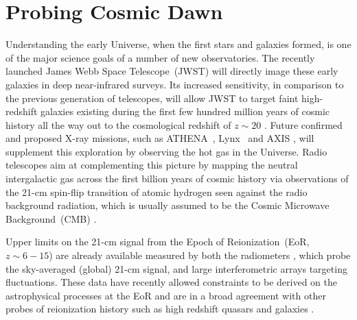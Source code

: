 \section{Probing Cosmic Dawn}\label{sec1}

Understanding the early Universe, when the first stars and galaxies formed, is one of the major science goals of a number of new observatories. The recently launched James Webb Space Telescope~(JWST) will directly image these early galaxies in deep near-infrared surveys. Its increased sensitivity, in comparison to the previous generation of telescopes, will allow JWST to target faint high-redshift galaxies existing during the first few hundred million years of cosmic history all the way out to the cosmological redshift of $z\sim 20$ \cite{Windhorst_JWST_2006}. Future confirmed and proposed X-ray missions, such as ATHENA~\citep[Advanced Telescope for High Energy Astrophysics,][]{Athena}, Lynx~\cite{Lynx} and AXIS \citep[Advanced X-ray Imaging Satellite,][]{axis}, will supplement this exploration by observing the hot gas in the Universe. Radio telescopes aim at complementing this picture by mapping the neutral intergalactic gas across the first billion years of cosmic history via observations of the 21-cm spin-flip transition of atomic hydrogen seen against the radio background radiation, which is usually assumed to be the Cosmic Microwave Background~(CMB) \cite{Madau1997, Mesinger2019}. 

Upper limits on the 21-cm signal from the Epoch of Reionization~(EoR, $z\sim6-15$) are already available measured by both the radiometers \cite{ EDGES_high_band_experimental_paper_2017, SARAS2_radiometer_2018}, which probe the sky-averaged (global) 21-cm signal, and large interferometric arrays \cite{HERA_2017, LOFAR_current_EoR_2018, Price_LEDA_2018, Trott_mwa_2020, Gehlot_lofar_2019} targeting fluctuations. These data have recently allowed constraints to be derived on the astrophysical processes at the EoR \cite[][e.g. \cref{ch:saras2},]{Singh_saras2_2017, Singh_saras2_2018, Monsalve_EDGES_HB_3_2019, Mondal_LOFAR_2020, Ghara_MWA_2021, Greig_LOFAR_2021, HERA_2022b, Bevins_SARAS2_2022} and are in a broad agreement with other probes of reionization history such as high redshift quasars and galaxies \cite{Mesinger_2010, Schroder_2012, Ouchi_2018, Morales_2021, Greig_2022}.

